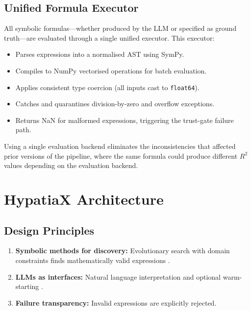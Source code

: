\documentclass[twoside,11pt]{article}
\newcommand{\Rsq}{R^{2}}
\begin{document}
\subsection{Unified Formula Executor}\label{subsec:unified-formula-executor}
\label{sec:executor}

All symbolic formulas---whether produced by the LLM or specified as ground truth---are
evaluated through a single unified executor.  This executor:
\begin{itemize}
  \item Parses expressions into a normalised AST using SymPy.
  \item Compiles to NumPy vectorised operations for batch evaluation.
  \item Applies consistent type coercion (all inputs cast to \texttt{float64}).
  \item Catches and quarantines division-by-zero and overflow exceptions.
  \item Returns NaN for malformed expressions, triggering the trust-gate failure path.
\end{itemize}
Using a single evaluation backend eliminates the inconsistencies that affected
prior versions of the pipeline, where the same formula could produce different
$\Rsq$ values depending on the evaluation backend.

\section{HypatiaX Architecture}
\label{sec:architecture}

\subsection{Design Principles}\label{subsec:design-principles}
\label{sec:arch_principles}

\begin{enumerate}
\item \textbf{Symbolic methods for discovery:} Evolutionary search with domain
  constraints finds mathematically valid expressions \citep{cranmer2023pysr}.
\item \textbf{LLMs as interfaces:} Natural language interpretation and optional
  warm-starting \citep{kambhampati2024llms}.
\item \textbf{Failure transparency:} Invalid expressions are explicitly rejected.
\end{enumerate}
\end{document}
